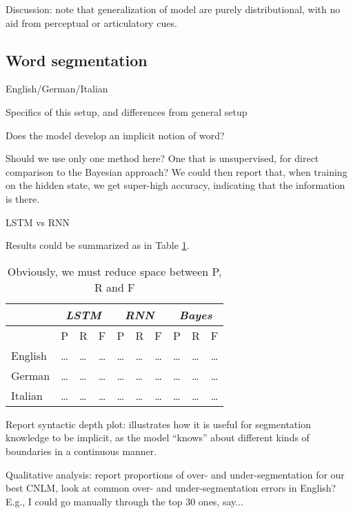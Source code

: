 Discussion: note that generalization of model are purely
distributional, with no aid from perceptual or articulatory cues.


\subsection{Word segmentation}
\label{sec:segmentation}

English/German/Italian

Specifics of this setup, and differences from general setup

Does the model develop an implicit notion of word?

Should we use only one method here? One that is unsupervised, for
direct comparison to the Bayesian approach? We could then report that,
when training on the hidden state, we get super-high accuracy,
indicating that the information is there.

LSTM vs RNN

Results could be summarized as in Table \ref{tab:segmentation-results}.


\begin{table}[t]
  \begin{center}
    \begin{tabular}{l|lll|lll|lll}
      \multicolumn{1}{c}{}&\multicolumn{3}{c}{\emph{LSTM}}&\multicolumn{3}{c}{\emph{RNN}}&\multicolumn{3}{c}{\emph{Bayes}}\\
      \hline
      &P&R&F&P&R&F&P&R&F\\
      \hline
      English &\ldots & \ldots & \ldots &\ldots & \ldots & \ldots&\ldots & \ldots & \ldots\\
      German &\ldots & \ldots & \ldots &\ldots & \ldots & \ldots&\ldots & \ldots & \ldots\\
      Italian &\ldots & \ldots & \ldots &\ldots & \ldots & \ldots&\ldots & \ldots & \ldots\\
    \end{tabular}
  \end{center}
  \caption{\label{tab:segmentation-results} Obviously, we must reduce space between P, R and F}
\end{table}

Report syntactic depth plot: illustrates how it is useful for
segmentation knowledge to be implicit, as the model ``knows'' about
different kinds of boundaries in a continuous manner.

Qualitative analysis: report proportions of over- and
under-segmentation for our best CNLM, look at common over- and
under-segmentation errors in English? E.g., I could go manually
through the top 30 ones, say...

